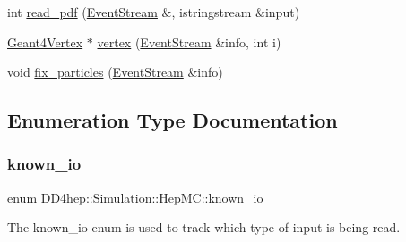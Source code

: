 \begin{DoxyCompactItemize}
\item 
int \hyperlink{namespace_d_d4hep_1_1_simulation_1_1_hep_m_c_a599dd238f1b1dc069a14f3bf57c09cfb}{read\+\_\+pdf} (\hyperlink{class_d_d4hep_1_1_simulation_1_1_hep_m_c_1_1_event_stream}{Event\+Stream} \&, istringstream \&input)
\item 
\hyperlink{class_d_d4hep_1_1_simulation_1_1_geant4_vertex}{Geant4\+Vertex} $\ast$ \hyperlink{namespace_d_d4hep_1_1_simulation_1_1_hep_m_c_a3a13a13dbe2dce0cfbea9607895abf14}{vertex} (\hyperlink{class_d_d4hep_1_1_simulation_1_1_hep_m_c_1_1_event_stream}{Event\+Stream} \&info, int i)
\item 
void \hyperlink{namespace_d_d4hep_1_1_simulation_1_1_hep_m_c_a07b61ea67e59ff0e064a976336f7f3f3}{fix\+\_\+particles} (\hyperlink{class_d_d4hep_1_1_simulation_1_1_hep_m_c_1_1_event_stream}{Event\+Stream} \&info)
\end{DoxyCompactItemize}


\subsection{Enumeration Type Documentation}
\hypertarget{namespace_d_d4hep_1_1_simulation_1_1_hep_m_c_abd57f9534b4e3e74fa2e5f25525d452c}{}\label{namespace_d_d4hep_1_1_simulation_1_1_hep_m_c_abd57f9534b4e3e74fa2e5f25525d452c} 
\subsubsection{\texorpdfstring{known\+\_\+io}{known\_io}}
{\footnotesize\ttfamily enum \hyperlink{namespace_d_d4hep_1_1_simulation_1_1_hep_m_c_abd57f9534b4e3e74fa2e5f25525d452c}{D\+D4hep\+::\+Simulation\+::\+Hep\+M\+C\+::known\+\_\+io}}



The known\+\_\+io enum is used to track which type of input is being read. 

